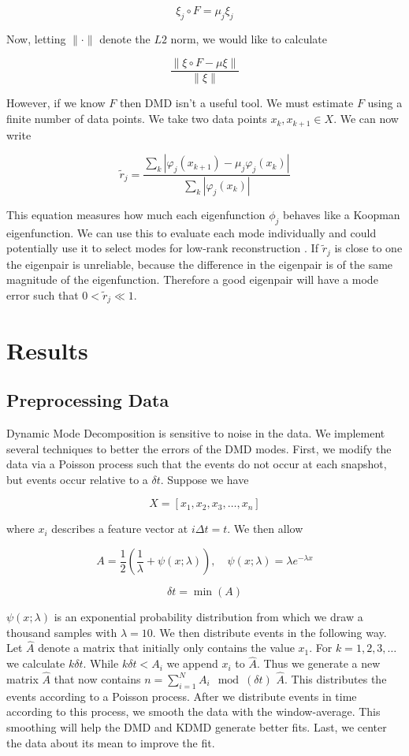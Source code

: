 $$
\xi_j \circ F = \mu_j \xi_j
$$

\noindent Now, letting $\|\cdot\|$ denote the $L2$ norm, we would like to calculate 

$$
\frac{\| \xi \circ F - \mu \xi \|}{\| \xi \|}
$$

\noindent However, if we know $F$ then DMD isn't a useful tool.
We must estimate $F$ using a finite number of data points. We take
two data points $x_k, x_{k+1} \in X$. We can now write 

$$
{\tilde r}_{j} = \frac{\sum_{k} |\varphi_j(x_{k+1}) - \mu_j \varphi_j(x_{k})|}{\sum_{k} |\varphi_j(x_k )|}
$$

This equation measures how much each eigenfunction $\phi_j$ behaves like a Koopman eigenfunction. We can use 
this to evaluate each mode individually and could potentially use it to select modes for low-rank reconstruction \cite{zhang2017evaluating}. If ${{\tilde r}_j}$ is close to one
the eigenpair is unreliable, because the difference in the eigenpair is of the same magnitude of the eigenfunction. Therefore a 
good eigenpair will have a mode error such that $0< {{\tilde r}_j} \ll 1$.

\chapter{Results}

\section{Preprocessing Data}
Dynamic Mode Decomposition is sensitive to
 noise in the data. We implement several techniques to better the errors of the DMD modes.
  First, we modify the data via a Poisson process such that the events do not occur at each
snapshot, but events occur relative to a $\delta t$. Suppose we have 

$$
X = [x_1,x_2,x_3,\dots, x_n]
$$

\noindent where $x_i$ describes a feature vector at $i \Delta t = t$. We then allow

$$
A = \frac{1}{2} \left( \frac{1}{\lambda} +  \psi(x;\lambda) \right), \quad \psi(x;\lambda) = \lambda e^{-\lambda x}
$$

$$
\delta t = \min(A)
$$

 $\psi(x;\lambda)$ is an exponential probability distribution from which we draw a thousand samples with $\lambda=10$.
  We then distribute events in the following
way. Let ${\hat A}$ denote a matrix that initially only contains the value $x_1$. For $k=1,2,3,\dots$ we calculate $k \delta t$. While $k\delta t < A_i$ we append $x_i$ to 
 ${\hat A}$. Thus we generate a new matrix ${\hat A}$ that now contains $n = \sum^{N}_{i=1} A_i \mod(\delta t)$ 
${\hat A}$. This distributes the events according to a Poisson process. After we distribute events in time according to this process, we
 smooth the data with the window-average. This smoothing will help the DMD and KDMD generate better fits. Last, we center the data about its mean to improve the fit.

